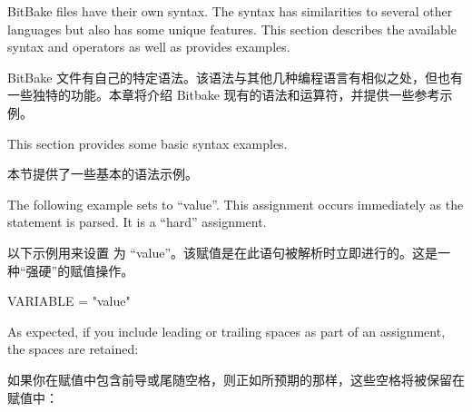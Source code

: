% 
% 
% 



BitBake files have their own syntax. The syntax has similarities to several other languages but also has some unique features. This section describes the available syntax and operators as well as provides examples.

BitBake 文件有自己的特定语法。该语法与其他几种编程语言有相似之处，但也有一些独特的功能。本章将介绍 Bitbake 现有的语法和运算符，并提供一些参考示例。


This section provides some basic syntax examples.

本节提供了一些基本的语法示例。


\label{section:Basic Variable Setting}
The following example sets  to ``value''. This assignment occurs immediately as the statement is parsed. It is a ``hard'' assignment\footnotemark[1].

以下示例用来设置  为 ``value''。该赋值是在此语句被解析时立即进行的。这是一种``强硬''的赋值操作\footnotemark[1]。

\begin{pyglist}
VARIABLE = "value"
\end{pyglist}

As expected, if you include leading or trailing spaces as part of an assignment, the spaces are retained:

如果你在赋值中包含前导或尾随空格，则正如所预期的那样，这些空格将被保留在赋值中：


